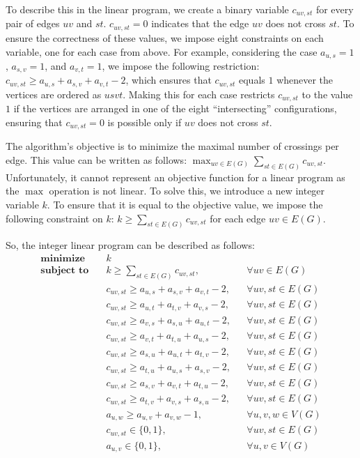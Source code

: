 \documentclass{article}
\begin{document}
    To describe this in the linear program, we create a binary variable $c_{uv, st}$ for every pair of edges $uv$ and $st$.
    $c_{uv, st} = 0$ indicates that the edge $uv$ does not cross $st$.
    To ensure the correctness of these values, we impose eight constraints on each variable, one for each case from above.
    For example, considering the case $a_{u,s} = 1$, $a_{s,v} = 1$, and $a_{v,t} = 1$, we impose the following restriction: $c_{uv, st} \geqslant a_{u,s} + a_{s,v} + a_{v,t} - 2$, which ensures that $c_{uv, st}$ equals $1$ whenever the vertices are ordered as $usvt$.
    Making this for each case restricts $c_{uv, st}$ to the value $1$ if the vertices are arranged in one of the eight ``intersecting'' configurations, ensuring that $c_{uv, st} = 0$ is possible only if $uv$ does not cross $st$.

    The algorithm's objective is to minimize the maximal number of crossings per edge.
    This value can be written as follows: $\max_{uv \in E(G)} \sum_{st \in E(G)} c_{uv, st}$.
    Unfortunately, it cannot represent an objective function for a linear program as the $\max$ operation is not linear.
    To solve this, we introduce a new integer variable $k$.
    To ensure that it is equal to the objective value, we impose the following constraint on $k$: $k \geqslant \sum_{st \in E(G)} c_{uv, st}$ for each edge $uv \in E(G)$.

    So, the integer linear program can be described as follows:
    \begin{align*}
        \textbf{minimize}\quad&k\\
        \textbf{subject to}\quad&k \geqslant \sum_{st \in E(G)} c_{uv, st},&&\forall uv \in E(G)\\
        &c_{uv, st} \geqslant a_{u,s} + a_{s,v} + a_{v,t} - 2,&&\forall uv, st \in E(G)\\
        &c_{uv, st} \geqslant a_{u,t} + a_{t,v} + a_{v,s} - 2,&&\forall uv, st \in E(G)\\
        &c_{uv, st} \geqslant a_{v,s} + a_{s,u} + a_{u,t} - 2,&&\forall uv, st \in E(G)\\
        &c_{uv, st} \geqslant a_{v,t} + a_{t,u} + a_{u,s} - 2,&&\forall uv, st \in E(G)\\
        &c_{uv, st} \geqslant a_{s,u} + a_{u,t} + a_{t,v} - 2,&&\forall uv, st \in E(G)\\
        &c_{uv, st} \geqslant a_{t,u} + a_{u,s} + a_{s,v} - 2,&&\forall uv, st \in E(G)\\
        &c_{uv, st} \geqslant a_{s,v} + a_{v,t} + a_{t,u} - 2,&&\forall uv, st \in E(G)\\
        &c_{uv, st} \geqslant a_{t,v} + a_{v,s} + a_{s,u} - 2,&&\forall uv, st \in E(G)\\
        &a_{u, w} \geqslant a_{u, v} + a_{v, w} - 1,&&\forall u, v, w \in V(G)\\
        &c_{uv, st} \in \{0, 1\},&&\forall uv, st \in E(G)\\
        &a_{u, v} \in \{0, 1\},&&\forall u, v \in V(G)\\
    \end{align*}
\end{document}
